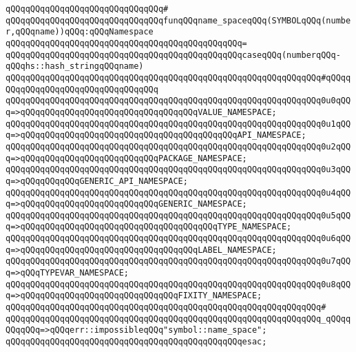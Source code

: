 \verb|qQQqqQQqqQQqqQQqqQQqqQQqqQQqqQQq#|\newline
\verb|qQQqqQQqqQQqqQQqqQQqqQQqqQQqqQQqfunqQQqname_spaceqQQq(SYMBOLqQQq(number,qQQqname))qQQq:qQQqNamespace|\newline
\verb|qQQqqQQqqQQqqQQqqQQqqQQqqQQqqQQqqQQqqQQqqQQqqQQq=|\newline
\verb|qQQqqQQqqQQqqQQqqQQqqQQqqQQqqQQqqQQqqQQqqQQqqQQqcaseqQQq(numberqQQq-qQQqhs::hash_stringqQQqname)|\newline
\verb|qQQqqQQqqQQqqQQqqQQqqQQqqQQqqQQqqQQqqQQqqQQqqQQqqQQqqQQqqQQqqQQq#qQQqqQQqqQQqqQQqqQQqqQQqqQQqqQQqqQQq|\newline
\verb|qQQqqQQqqQQqqQQqqQQqqQQqqQQqqQQqqQQqqQQqqQQqqQQqqQQqqQQqqQQqqQQq0u0qQQq=>qQQqqQQqqQQqqQQqqQQqqQQqqQQqqQQqqQQqVALUE_NAMESPACE;|\newline
\verb|qQQqqQQqqQQqqQQqqQQqqQQqqQQqqQQqqQQqqQQqqQQqqQQqqQQqqQQqqQQqqQQq0u1qQQq=>qQQqqQQqqQQqqQQqqQQqqQQqqQQqqQQqqQQqqQQqqQQqAPI_NAMESPACE;|\newline
\verb|qQQqqQQqqQQqqQQqqQQqqQQqqQQqqQQqqQQqqQQqqQQqqQQqqQQqqQQqqQQqqQQq0u2qQQq=>qQQqqQQqqQQqqQQqqQQqqQQqqQQqPACKAGE_NAMESPACE;|\newline
\verb|qQQqqQQqqQQqqQQqqQQqqQQqqQQqqQQqqQQqqQQqqQQqqQQqqQQqqQQqqQQqqQQq0u3qQQq=>qQQqqQQqqQQqGENERIC_API_NAMESPACE;|\newline
\verb|qQQqqQQqqQQqqQQqqQQqqQQqqQQqqQQqqQQqqQQqqQQqqQQqqQQqqQQqqQQqqQQq0u4qQQq=>qQQqqQQqqQQqqQQqqQQqqQQqqQQqGENERIC_NAMESPACE;|\newline
\verb|qQQqqQQqqQQqqQQqqQQqqQQqqQQqqQQqqQQqqQQqqQQqqQQqqQQqqQQqqQQqqQQq0u5qQQq=>qQQqqQQqqQQqqQQqqQQqqQQqqQQqqQQqqQQqqQQqTYPE_NAMESPACE;|\newline
\verb|qQQqqQQqqQQqqQQqqQQqqQQqqQQqqQQqqQQqqQQqqQQqqQQqqQQqqQQqqQQqqQQq0u6qQQq=>qQQqqQQqqQQqqQQqqQQqqQQqqQQqqQQqqQQqLABEL_NAMESPACE;|\newline
\verb|qQQqqQQqqQQqqQQqqQQqqQQqqQQqqQQqqQQqqQQqqQQqqQQqqQQqqQQqqQQqqQQq0u7qQQq=>qQQqTYPEVAR_NAMESPACE;|\newline
\verb|qQQqqQQqqQQqqQQqqQQqqQQqqQQqqQQqqQQqqQQqqQQqqQQqqQQqqQQqqQQqqQQq0u8qQQq=>qQQqqQQqqQQqqQQqqQQqqQQqqQQqqQQqFIXITY_NAMESPACE;|\newline
\verb|qQQqqQQqqQQqqQQqqQQqqQQqqQQqqQQqqQQqqQQqqQQqqQQqqQQqqQQqqQQqqQQq#|\newline
\verb|qQQqqQQqqQQqqQQqqQQqqQQqqQQqqQQqqQQqqQQqqQQqqQQqqQQqqQQqqQQqqQQq_qQQqqQQqqQQq=>qQQqerr::impossibleqQQq"symbol::name_space";|\newline
\verb|qQQqqQQqqQQqqQQqqQQqqQQqqQQqqQQqqQQqqQQqqQQqqQQqesac;|\newline
